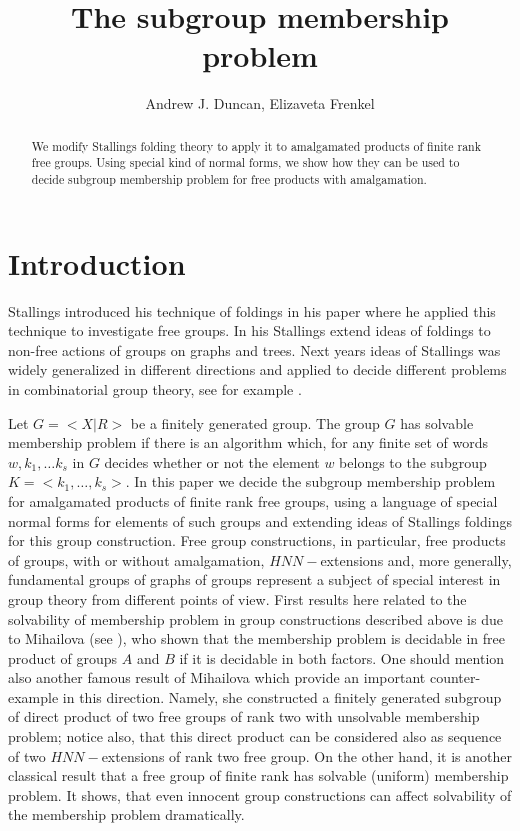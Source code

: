 \documentclass[a4paper,12pt]{article}
\title{The subgroup membership problem
}
\author{Andrew J. Duncan, Elizaveta Frenkel}
\numberwithin{equation}{section}
\numberwithin{figure}{section}
\begin{document}
\maketitle

\begin{abstract}
We modify Stallings folding theory to apply it to amalgamated
products of finite rank free groups. Using special kind of normal
forms, we show how they can be used to decide subgroup membership
problem for free products with amalgamation.
 \end{abstract}



\section{Introduction}\label{se:global_intro}
Stallings introduced his technique of foldings in his paper
\cite{stallings83} where he applied this technique to investigate
free groups. In his \cite{stallings88} Stallings extend ideas of
foldings to non-free actions of groups on graphs and trees. Next
years ideas of Stallings was widely generalized in different
directions and applied to decide different problems in
combinatorial group theory, see for example
\cite{befe,BoWei,KM02,SilvaWeil08}.

Let $G = <X|R>$ be a finitely generated group. The group $G$ has
solvable membership problem if there is an algorithm which, for
any finite set of words $w, k_1, \ldots k_s$ in $G$ decides
whether or not the element $w$ belongs to the subgroup $K = <k_1,
\ldots, k_s>$. In this paper we decide the subgroup membership
problem for amalgamated products of finite rank free groups, using
a language of special normal forms for elements of such groups and
extending ideas of Stallings foldings for this group construction.
Free group constructions, in particular, free products of groups,
with or without amalgamation, $HNN-$extensions
 and, more generally, fundamental groups
of graphs of groups represent a subject of special interest in
group theory from different points of view. First results here
related to the solvability of membership problem in group
constructions described above is due to Mihailova (see
\cite{mi59,mi68}), who shown that the membership problem is
decidable in free product of groups $A$ and $B$ if it is decidable
in both factors. One should mention also another famous result of
Mihailova \cite{mi58} which provide an important counter-example
in this direction. Namely, she constructed a finitely generated
subgroup of direct product of two free groups of rank two with
unsolvable membership problem; notice also, that this direct
product can be considered also as sequence of two $HNN-$extensions
of rank two free group. On the other hand, it is another classical
result that a free group of finite rank has solvable (uniform)
membership problem. It shows, that even innocent group
constructions can affect solvability of the membership problem
dramatically.
\end{document}
